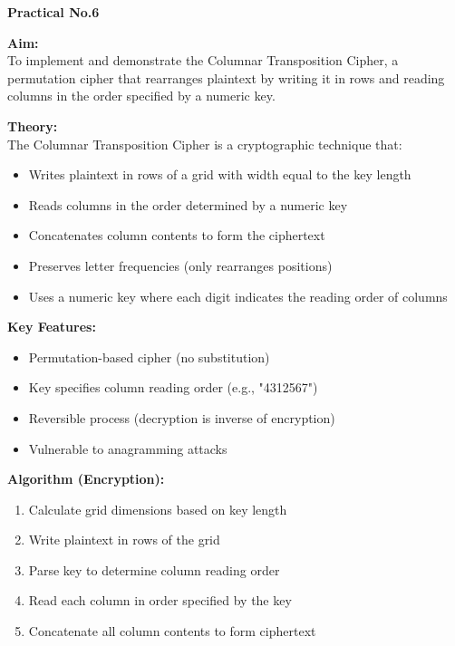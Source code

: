 \documentclass[12pt,a4paper]{article}
\begin{document}
\begin{center}
    \LARGE \textbf{Practical No.6}
\end{center}

\noindent \large \textbf{Aim:} \\
\normalsize
To implement and demonstrate the Columnar Transposition Cipher, a permutation cipher that rearranges plaintext by writing it in rows and reading columns in the order specified by a numeric key.

\vspace{0.5cm}

\noindent \large \textbf{Theory:} \\
\normalsize
The Columnar Transposition Cipher is a cryptographic technique that:

\begin{itemize}
    \item Writes plaintext in rows of a grid with width equal to the key length
    \item Reads columns in the order determined by a numeric key
    \item Concatenates column contents to form the ciphertext
    \item Preserves letter frequencies (only rearranges positions)
    \item Uses a numeric key where each digit indicates the reading order of columns
\end{itemize}

\textbf{Key Features:}
\begin{itemize}
    \item Permutation-based cipher (no substitution)
    \item Key specifies column reading order (e.g., "4312567")
    \item Reversible process (decryption is inverse of encryption)
    \item Vulnerable to anagramming attacks
\end{itemize}

\textbf{Algorithm (Encryption):}
\begin{enumerate}
    \item Calculate grid dimensions based on key length
    \item Write plaintext in rows of the grid
    \item Parse key to determine column reading order
    \item Read each column in order specified by the key
    \item Concatenate all column contents to form ciphertext
\end{enumerate}
\end{document}
